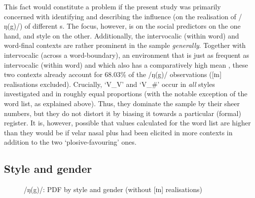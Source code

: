 This fact would constitute a problem if the present study was primarily concerned with identifying and describing the influence (on the realisation of /ŋ(g)/) of different s.
The focus, however, is on the social predictors on the one hand, and style on the other.
Additionally, the intervocalic (within word) and word-final contexts are rather prominent in the sample \emph{generally}.
Together with intervocalic (across a word-boundary), an environment that is just as frequent as intervocalic (within word) and which also has a comparatively high mean , these two contexts  already account for 68.03\% of the /ŋ(g)/ observations ([ɪn] realisations excluded).
Crucially, `V\_V' and `V\_\#' occur in \emph{all} styles investigated and in roughly equal proportions (with the notable exception of the word list, as explained above).
Thus, they dominate the sample by their sheer numbers, but they do not distort it by biasing it towards a particular (formal) register.
It is, however, possible that  values calculated for the word list are higher than they would be if velar nasal plus had been elicited in more contexts in addition to the two `plosive-favouring' ones.

\subsection{Style and gender}
\label{sec.prod.res.con.ng.stylegender}

\begin{figure}
	
		\resizebox{.49\linewidth}{!}{} 
	\caption{/ŋ(g)/: PDF by style and gender (without [ɪn] realisations)}
	\label{fig.box.ng.stylegender}
\end{figure}

